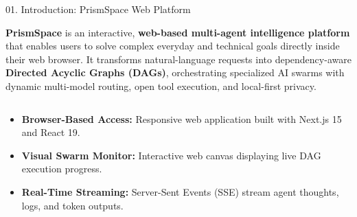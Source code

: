 \documentclass[aspectratio=169,10pt]{beamer}
\begin{document}
\begin{frame}[t]{01. Introduction: PrismSpace Web Platform}
\vspace{-0.30em}
\centering

\begin{tcolorbox}[
  enhanced, arc=4pt, colframe=lavenderDark!85, colback=lavenderLight!35,
  boxrule=0.75pt, width=0.98\linewidth, left=10pt, right=10pt, top=6pt, bottom=6pt
]
\fontsize{7.5}{10.2}\selectfont\sffamily\color{lavenderDeep}
  \textbf{\fontsize{9.0}{11.0}\selectfont\color{lavenderDark}PrismSpace} is an interactive, \textbf{web-based multi-agent intelligence platform} that enables users to solve complex everyday and technical goals directly inside their web browser. It transforms natural-language requests into dependency-aware \textbf{Directed Acyclic Graphs (DAGs)}, orchestrating specialized AI swarms with dynamic multi-model routing, open tool execution, and local-first privacy.
\end{tcolorbox}

\vspace{-0.20em}

\begin{columns}[T, totalwidth=0.98\linewidth]

  \begin{column}{0.32\linewidth}
    \begin{tcolorbox}[
      enhanced, arc=3.5pt, colframe=lavenderDark, colback=white,
      title={\scriptsize\bfseries\color{white}\faGlobe\ 1. Reactive Web Workspace},
      colbacktitle=lavenderDark, boxrule=0.6pt,
      left=5pt, right=5pt, top=3.5pt, bottom=3.5pt, height=3.85cm
    ]
    \fontsize{5.6}{6.8}\selectfont
    \begin{itemize}\setlength{\itemsep}{2.5pt}
      \item \textbf{Browser-Based Access:} Responsive web application built with Next.js 15 and React 19.
      \item \textbf{Visual Swarm Monitor:} Interactive web canvas displaying live DAG execution progress.
      \item \textbf{Real-Time Streaming:} Server-Sent Events (SSE) stream agent thoughts, logs, and token outputs.
    \end{itemize}
    \end{tcolorbox}
  \end{column}


\end{columns}
\end{frame}
\end{document}
